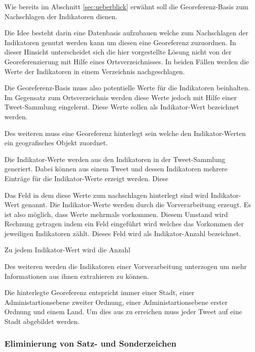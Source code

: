 				Wie bereits im Abschnitt \ref{sec:ueberblick} erwähnt soll die Georeferenz-Basis zum Nachschlagen der Indikatoren dienen.  

				Die Idee besteht darin eine Datenbasis aufzubauen welche zum Nachschlagen der Indikatoren genutzt werden kann um diesen eine Georeferenz zuzuordnen.
				In dieser Hinsicht unterscheidet sich die hier vorgestellte Lösung nicht von der Georeferenzierung mit Hilfe eines Ortsverzeichnisses.
				In beiden Fällen werden die Werte der Indikatoren in einem Verzeichnis nachgeschlagen. 
				
				Die Georeferenz-Basis muss also potentielle Werte für die Indikatoren beinhalten.
				Im Gegensatz zum Ortsverzeichnis werden diese Werte jedoch mit Hilfe einer Tweet-Sammlung eingelernt.
				Diese Werte sollen als Indikator-Wert bezeichnet werden.

				Des weiteren muss eine Georeferenz hinterlegt sein welche den Indikator-Werten ein geografisches Objekt zuordnet.

				
				Die Indikator-Werte werden aus den Indikatoren in der Tweet-Sammlung generiert.
				Dabei können aus einem Tweet und dessen Indikatoren mehrere Einträge für die Indikator-Werte erzeigt werden. 
				Diese  

				Das Feld in dem diese Werte zum nachschlagen hinterlegt sind wird Indikator-Wert genannt. 
				Die Indikator-Werte werden durch die Vorverarbeitung erzeugt.   
				Es ist also möglich, dass Werte mehrmals vorkommen. 
				Diesem Umstand wird Rechnung getragen indem ein Feld eingeführt wird welches das Vorkommen der jeweiligen Indikatoren zählt. 
				Dieses Feld wird als Indikator-Anzahl bezeichnet.

				Zu jedem Indikator-Wert wird die Anzahl 

				Des weiteren werden die Indikatoren einer Vorverarbeitung unterzogen um mehr Informationen aus ihnen extrahieren zu können. 

				Die hinterlegte Georeferenz entspricht immer einer Stadt, einer Administartionsebene zweiter Ordnung, einer Administartionsebene erster Ordnung und einem Land. 
				Um dies aus zu erreichen muss jeder Tweet auf eine Stadt abgebildet werden.


		  	\subsubsection{Eliminierung von Satz- und Sonderzeichen}

